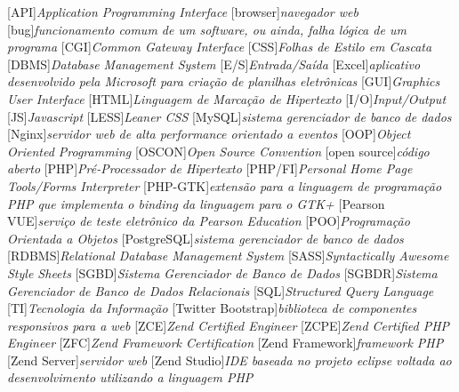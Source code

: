 
			[API]{\textit{Application Programming Interface}}
		[browser]{\textit{navegador web}}
			[bug]{\textit{funcionamento comum de um software, ou ainda, falha
lógica de um programa}}
			[CGI]{\textit{Common Gateway Interface }}
			[CSS]{\textit{Folhas de Estilo em Cascata}}
			[DBMS]{\textit{Database Management System}}
			[E/S]{\textit{Entrada/Saída}}
		[Excel]{\textit{aplicativo desenvolvido pela Microsoft para
criação de planilhas eletrônicas}}
			[GUI]{\textit{Graphics User Interface}}
			[HTML]{\textit{Linguagem de Marcação de Hipertexto}}
			[I/O]{\textit{Input/Output}}
			[JS]{\textit{Javascript}}
			[LESS]{\textit{Leaner CSS}}
		[MySQL]{\textit{sistema gerenciador de banco de dados}}
		[Nginx]{\textit{servidor web de alta performance orientado a
eventos}}
			[OOP]{\textit{Object Oriented Programming}}
		[OSCON]{\textit{Open Source Convention}}
	[open source]{\textit{código aberto}}
			[PHP]{\textit{Pré-Processador de Hipertexto}}
		[PHP/FI]{\textit{Personal Home Page Tools/Forms Interpreter}}
		[PHP-GTK]{\textit{extensão para a linguagem de programação PHP
que implementa o binding da linguagem para o GTK+}}
	[Pearson VUE]{\textit{serviço de teste eletrônico da Pearson Education}}
			[POO]{\textit{Programação Orientada a Objetos}}
	[PostgreSQL]{\textit{sistema gerenciador de banco de dados}}
		[RDBMS]{\textit{Relational Database Management System}}
			[SASS]{\textit{Syntactically Awesome Style Sheets}}
			[SGBD]{\textit{Sistema Gerenciador de Banco de Dados}}
			[SGBDR]{\textit{Sistema Gerenciador de Banco de Dados
Relacionais}}
			[SQL]{\textit{Structured Query Language}}
			[TI]{\textit{Tecnologia da Informação}}
[Twitter Bootstrap]{\textit{biblioteca de
componentes responsivos para a web}}
			[ZCE]{\textit{Zend Certified Engineer}}
			[ZCPE]{\textit{Zend Certified PHP Engineer}}
			[ZFC]{\textit{Zend Framework Certification}}
[Zend Framework]{\textit{framework PHP}}
	[Zend Server]{\textit{servidor web}}
	[Zend Studio]{\textit{IDE baseada no projeto eclipse voltada
ao desenvolvimento utilizando a linguagem PHP}}
